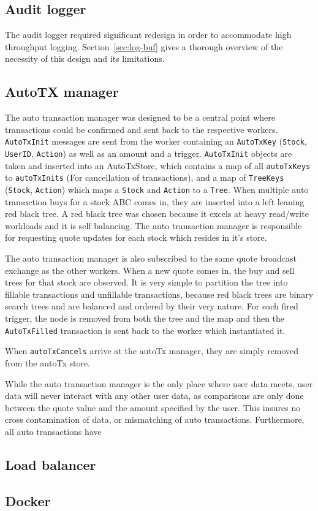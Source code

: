 \subsection{Audit logger}
The audit logger required significant redesign in order to accommodate high throughput logging. Section~\ref{sec:log-buf} gives a thorough overview of the necessity of this design and its limitations.

\subsection{AutoTX manager}
The auto transaction manager was designed to be a central point where transactions could be confirmed and sent back to the respective workers. \texttt{AutoTxInit} messages are sent from the worker containing an \texttt{AutoTxKey} (\texttt{Stock}, \texttt{UserID}, \texttt{Action}) as well as an amount and a trigger. \texttt{AutoTxInit} objects are taken and inserted into an AutoTxStore, which contains a map of all \texttt{autoTxKeys} to \texttt{autoTxInits} (For cancellation of transactions), and a map of \texttt{TreeKeys} (\texttt{Stock}, \texttt{Action}) which maps a \texttt{Stock} and \texttt{Action} to a \texttt{Tree}. When multiple auto transaction buys for a stock ABC comes in, they are inserted into a left leaning red black tree. A red black tree was chosen because it excels at heavy read/write workloads and it is self balancing. The auto transaction manager is responsible for requesting quote updates for each stock which resides in it’s store.

The auto transaction manager is also subscribed to the same quote broadcast exchange as the other workers. When a new quote comes in, the buy and sell trees for that stock are observed. It is very simple to partition the tree into fillable transactions and unfillable transactions, because red black trees are binary search trees and are balanced and ordered by their very nature. For each fired trigger, the node is removed from both the tree and the map and then the \texttt{AutoTxFilled} transaction is sent back to the worker which instantiated it.

When \texttt{autoTxCancels} arrive at the autoTx manager, they are simply removed from the autoTx store.

While the auto transaction manager is the only place where user data meets, user data will never interact with any other user data, as comparisons are only done between the quote value and the amount specified by the user. This insures no cross contamination of data, or mismatching of auto transactions. Furthermore, all auto transactions have

\subsection{Load balancer}

\subsection{Docker}
